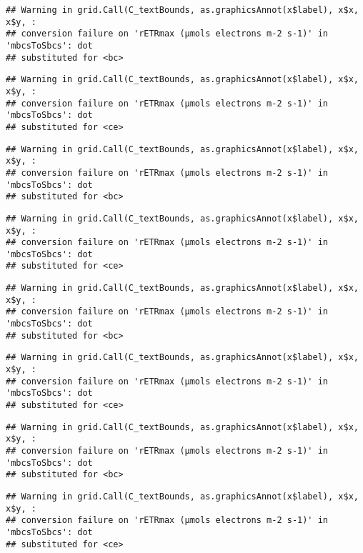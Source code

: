 \documentclass[
]{article}
\begin{document}
\begin{verbatim}
## Warning in grid.Call(C_textBounds, as.graphicsAnnot(x$label), x$x, x$y, :
## conversion failure on 'rETRmax (μmols electrons m-2 s-1)' in 'mbcsToSbcs': dot
## substituted for <bc>
\end{verbatim}

\begin{verbatim}
## Warning in grid.Call(C_textBounds, as.graphicsAnnot(x$label), x$x, x$y, :
## conversion failure on 'rETRmax (μmols electrons m-2 s-1)' in 'mbcsToSbcs': dot
## substituted for <ce>
\end{verbatim}

\begin{verbatim}
## Warning in grid.Call(C_textBounds, as.graphicsAnnot(x$label), x$x, x$y, :
## conversion failure on 'rETRmax (μmols electrons m-2 s-1)' in 'mbcsToSbcs': dot
## substituted for <bc>
\end{verbatim}

\begin{verbatim}
## Warning in grid.Call(C_textBounds, as.graphicsAnnot(x$label), x$x, x$y, :
## conversion failure on 'rETRmax (μmols electrons m-2 s-1)' in 'mbcsToSbcs': dot
## substituted for <ce>
\end{verbatim}

\begin{verbatim}
## Warning in grid.Call(C_textBounds, as.graphicsAnnot(x$label), x$x, x$y, :
## conversion failure on 'rETRmax (μmols electrons m-2 s-1)' in 'mbcsToSbcs': dot
## substituted for <bc>
\end{verbatim}

\begin{verbatim}
## Warning in grid.Call(C_textBounds, as.graphicsAnnot(x$label), x$x, x$y, :
## conversion failure on 'rETRmax (μmols electrons m-2 s-1)' in 'mbcsToSbcs': dot
## substituted for <ce>
\end{verbatim}

\begin{verbatim}
## Warning in grid.Call(C_textBounds, as.graphicsAnnot(x$label), x$x, x$y, :
## conversion failure on 'rETRmax (μmols electrons m-2 s-1)' in 'mbcsToSbcs': dot
## substituted for <bc>
\end{verbatim}

\begin{verbatim}
## Warning in grid.Call(C_textBounds, as.graphicsAnnot(x$label), x$x, x$y, :
## conversion failure on 'rETRmax (μmols electrons m-2 s-1)' in 'mbcsToSbcs': dot
## substituted for <ce>
\end{verbatim}
\end{document}
